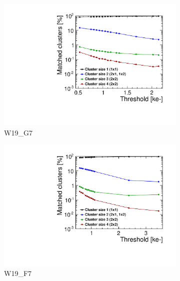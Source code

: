 \begin{figure}[htbp] \centering
  \begin{subfigure}[b]{0.33\textwidth}
    \includegraphics[width=\textwidth]{./figures/TestBeam/cluSize_THLscan_W0019_G07.pdf}
    \caption{W19\_G7}
  \end{subfigure} \hfill
  \begin{subfigure}[b]{0.33\textwidth}
    \includegraphics[width=\textwidth]{./figures/TestBeam/cluSize_THLscan_W0019_F07.pdf}
    \caption{W19\_F7}
  \end{subfigure}\hfill
  \begin{subfigure}[b]{0.33\textwidth}

\end{subfigure}
\end{figure}
